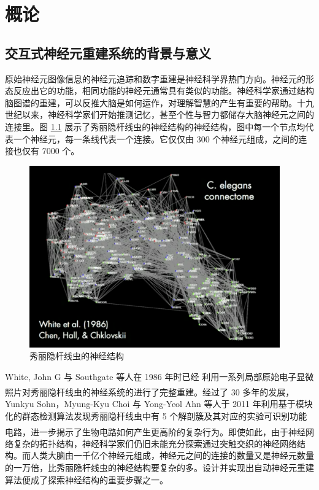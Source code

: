 \newcommand{\upcite}[1]{\textsuperscript{\textsuperscript{\cite{#1}}}}
\chapter{概论}
\section{交互式神经元重建系统的背景与意义}

原始神经元图像信息的神经元追踪和数字重建是神经科学界热门方向。神经元的形态反应出它的功能，相同功能的神经元通常具有类似的功能。神经科学家通过结构脑图谱的重建，可以反推大脑是如何运作，对理解智慧的产生有重要的帮助。十九世纪以来，神经科学家们开始推测记忆，甚至个性与智力都储存大脑神经元之间的连接里。图 \ref{worm} 展示了秀丽隐杆线虫的神经结构的神经结构，图中每一个节点均代表一个神经元，每一条线代表一个连接。它仅仅由 300 个神经元组成，之间的连接也仅有 7000 个。

\begin{figure}
\centering
\includegraphics[width=108mm]{images/worm}
\caption{秀丽隐杆线虫的神经结构}
\label{worm}
\end{figure}

White, John G 与 Southgate 等人在 1986 年时已经 利用一系列局部原始电子显微照片对秀丽隐杆线虫的神经系统的进行了完整重建\upcite{white1986structure}。经过了 30 多年的发展，Yunkyu Sohn，Myung-Kyu Choi 与 Yong-Yeol Ahn 等人于 2011 年利用基于模块化的群态检测算法发现秀丽隐杆线虫中有 5 个解剖簇及其对应的实验可识别功能电路，进一步揭示了生物电路如何产生更高阶的复杂行为\upcite{varshney2011structural}。即使如此，由于神经网络复杂的拓扑结构，神经科学家们仍旧未能充分探索通过突触交织的神经网络结构。而人类大脑由一千亿个神经元组成，神经元之间的连接的数量又是神经元数量的一万倍，比秀丽隐杆线虫的神经结构要复杂的多。设计并实现出自动神经元重建算法便成了探索神经结构的重要步骤之一。

